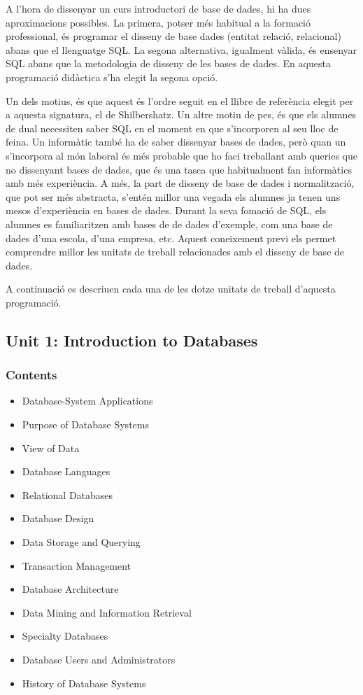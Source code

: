 \documentclass[catalan, a4paper, 12pt, titlepage]{article}
\begin{document}
A l'hora de dissenyar un curs introductori de base de dades, hi ha dues aproximacions possibles.
La primera, potser més habitual a la formació professional, és programar el disseny de base dades (entitat relació, relacional) abans que el llenguatge SQL.
La segona alternativa, igualment vàlida, és ensenyar SQL abans que la metodologia de disseny de les bases de dades.
En aquesta programació didàctica s'ha elegit la segona opció.

Un dels motius, és que aquest és l'ordre seguit en el llibre de referència elegit per a aquesta signatura, el de Shilbershatz.
Un altre motiu de pes, és que els alumnes de dual necessiten saber SQL en el moment en que s'incorporen al seu lloc de feina.
Un informàtic també ha de saber dissenyar bases de dades, però quan un s'incorpora al món laboral és més probable que ho faci treballant amb queries que no dissenyant bases de dades, que és una tasca que habitualment fan informàtics amb més experiència.
A més, la part de disseny de base de dades i normalització, que pot ser més abstracta, s'entén millor una vegada els alumnes ja tenen uns mesos d'experiència en bases de dades.
Durant la seva fomació de SQL, els alumnes es familiaritzen amb bases de de dades d'exemple, com una base de dades d'una escola, d'una empresa, etc.
Aquest coneixement previ els permet comprendre millor les unitats de treball relacionades amb el disseny de base de dades.

A continuació es descriuen cada una de les dotze unitats de treball d'aquesta programació.

  \subsection{Unit 1: Introduction to Databases}
  
  \subsubsection{Contents}

  \begin{itemize}
	  \item Database-System Applications
	  \item Purpose of Database Systems
	  \item View of Data
	  \item Database Languages
	  \item Relational Databases
	  \item Database Design
	  \item Data Storage and Querying
	  \item Transaction Management
	  \item Database Architecture
	  \item Data Mining and Information Retrieval
	  \item Specialty Databases
	  \item Database Users and Administrators
	  \item History of Database Systems
  \end{itemize}
  
\end{document}
